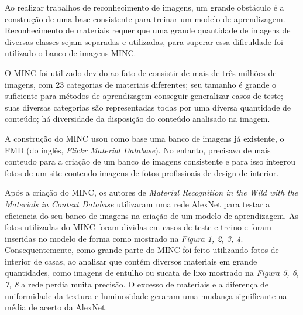 \documentclass[conference, compsoc, 12pt]{IEEEtran}
\begin{document}
Ao realizar trabalhos de reconhecimento de imagens, um grande obstáculo é a construção de uma base consistente para
treinar um modelo de aprendizagem. Reconhecimento de materiais requer que uma grande quantidade de imagens de diversas classes
sejam separadas e utilizadas, para superar essa dificuldade foi utilizado o banco de imagens MINC.

O MINC foi utilizado devido ao fato de consistir de mais de três milhões de imagens, com 23 categorias de materiais diferentes;
seu tamanho é grande o suficiente para métodos de aprendizagem conseguir generalizar casos de teste; suas diversas categorias
são representadas todas por uma diversa quantidade de conteúdo; há diversidade da disposição do conteúdo analisado na imagem.

A construção do MINC usou como base uma banco de imagens já existente, o FMD (do inglês, \textit{Flickr Material Database}). No entanto,
precisava de mais conteudo para a criação de um banco de imagens consistente e para isso integrou fotos de um site contendo imagens
de fotos profissioais de design de interior.

Após a criação do MINC, os autores de \emph{Material Recognition in the Wild with the Materials in Context Database} utilizaram uma rede AlexNet
\cite{Artigo principal} para testar a eficiencia do seu banco de imagens na criação de um modelo de aprendizagem.
As fotos utilizadas do MINC foram dividas em casos de teste e treino e foram inseridas no modelo de forma como mostrado na \emph{Figura 1, 2, 3, 4}.
Consequentemente, como grande parte do MINC foi feito utilizando fotos de interior de casas, ao analisar que contém diversos materiais em grande quantidades,
como imagens de entulho ou sucata de lixo mostrado na \emph{Figura 5, 6, 7, 8} a rede perdia muita precisão. O excesso de materiais e a diferença de uniformidade
da textura e luminosidade geraram uma mudança significante na média de acerto da AlexNet.
\end{document}
